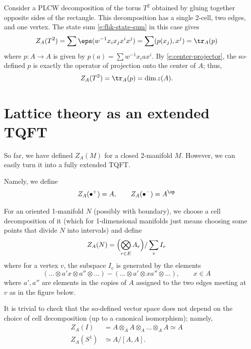 \begin{example}\label{x:lattice-T2}
  Consider a PLCW decomposition of the torus $T^2$
  obtained by gluing together opposite sides of the rectangle. This
  decomposition has a single 2-cell, two edges, and one vertex.
  The state sum \eqref{e:fhk-state-sum} in this case gives
  $$
    Z_A(T^2)=\sum \eps(w^{-1}x_ix_jx^ix^j)=\sum (p(x_j),x^j)=  \tr_A (p)
  $$
  where $p\colon A \to A$ is given by $p(a)=\sum w^{-1}x_iax^i$. By
  \eqref{e:center-projector}, the so-defined $p$ is exactly the operator of
  projection onto the center of $A$; thus,
  $$
   Z_A(T^2)= \tr_A (p)=\dim z(A).
  $$
\end{example}

\section{Lattice theory as an extended TQFT}\label{s:lattice-extended}
So far, we have defined $Z_A(M)$ for a closed 2-manifold $M$. However, we
can easily turn it into a fully extended TQFT.

Namely, we define
$$
Z_A(\bullet^+)=A, \qquad
Z_A(\bullet^-)=A^\op
$$

For an oriented 1-manifold $N$ (possibly with boundary), we choose a cell
decomposition of it (which for 1-dimensional manifolds just means choosing
some points that divide $N$ into intervals) and define
\begin{equation}\label{e:ZAN-def}
  Z_A(N) =\Bigl( \bigotimes_{r\in E} A_r\Bigr) /\sum_v I_v
\end{equation}
where for a vertex $v$, the subspace $I_v$ is generated by the elements
$$
  (\dots \otimes a' x\otimes a'' \otimes \dots)
- (\dots\otimes a'\otimes xa''\otimes \dots ), \qquad x\in A
$$
where $a', a''$ are elements in the copies of $A$ assigned to the two edges meeting at $v$ as in the figure below.

\begin{center}
\end{center}

It is trivial to check that the so-defined vector space does not depend on the
choice of cell decomposition (up to a canonical isomorphism); namely,
\begin{equation}\label{e:ZAI-ZAS1}
  \begin{aligned}
    Z_A(I)&=A\otimes_A A\otimes_A \dots \otimes_A A\simeq A\\
    Z_A(S^1)&\simeq A/[A,A].
  \end{aligned}
\end{equation}

